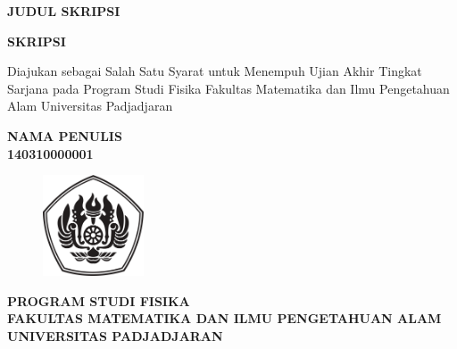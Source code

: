 \begin{titlepage}
\thispagestyle{empty}
    \begin{center}
        \begin{large}\begin{spacing}{1}
        \textbf{JUDUL SKRIPSI}
        \end{spacing}\end{large}
                
        \vspace{4cm}
        \textbf{SKRIPSI}
        
        \vspace{1cm}
        Diajukan sebagai Salah Satu Syarat untuk Menempuh Ujian Akhir Tingkat Sarjana pada Program Studi Fisika Fakultas Matematika dan Ilmu Pengetahuan Alam Universitas Padjadjaran
                
        \vspace{1cm}
        \textbf{NAMA PENULIS\\
        140310000001}

        \vspace{2cm}
        \begin{figure}[h]
            \centering
            \includegraphics[width=3cm]{Gambar/logo-unpad.pdf}
            \label{fig:unpadlogo}
        \end{figure}
        
        \vspace{2cm}
        \textbf{PROGRAM STUDI FISIKA\\
        FAKULTAS MATEMATIKA DAN ILMU PENGETAHUAN ALAM\\
        UNIVERSITAS PADJADJARAN\\}

        \vspace{\baselineskip}
        \textbf{\large \the\year{}}
    \end{center}
\end{titlepage}